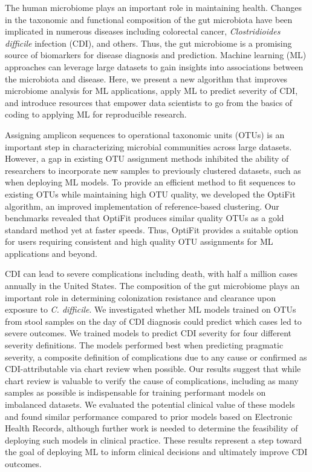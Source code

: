 The human microbiome plays an important role in maintaining health.
Changes in the taxonomic and functional composition of the gut microbiota have
been implicated in numerous diseases including colorectal cancer,
\textit{Clostridioides difficile} infection (CDI), and others.
Thus, the gut microbiome is a promising source of biomarkers for disease
diagnosis and prediction.
Machine learning (ML) approaches can leverage large datasets to gain insights
into associations between the microbiota and disease.
Here, we present a new algorithm that improves microbiome analysis for ML applications,
apply ML to predict severity of CDI,
and introduce resources that empower data scientists to go from the basics of
coding to applying ML for reproducible research.

Assigning amplicon sequences to operational taxonomic units (OTUs) is an
important step in characterizing microbial communities across large datasets.
However, a gap in existing OTU assignment methods inhibited the ability of
researchers to incorporate new samples to previously clustered datasets,
such as when deploying ML models.
To provide an efficient method to fit sequences to existing OTUs while
maintaining high OTU quality, we developed the OptiFit algorithm, an improved
implementation of reference-based clustering.
Our benchmarks revealed that OptiFit produces similar quality OTUs as a gold
standard method yet at faster speeds.
Thus, OptiFit provides a suitable option for users requiring consistent and
high quality OTU assignments for ML applications and beyond.

CDI can lead to severe complications including death, with half a million cases
annually in the United States.
The composition of the gut microbiome plays an important role in determining
colonization resistance and clearance upon exposure to \textit{C. difficile}.
We investigated whether ML models trained on OTUs from stool samples on
the day of CDI diagnosis could predict which cases led to severe outcomes.
We trained models to predict CDI severity for four different severity definitions.
The models performed best when predicting pragmatic severity, a composite
definition of complications due to any cause or confirmed as CDI-attributable
via chart review when possible.
Our results suggest that while chart review is valuable to verify the cause of
complications, including as many samples as possible is indispensable for
training performant models on imbalanced datasets.
We evaluated the potential clinical value of these models and found
similar performance compared to prior models based on Electronic Health Records,
although further work is needed to determine the feasibility of deploying such
models in clinical practice.
These results represent a step toward the goal of deploying ML to
inform clinical decisions and ultimately improve CDI outcomes.

